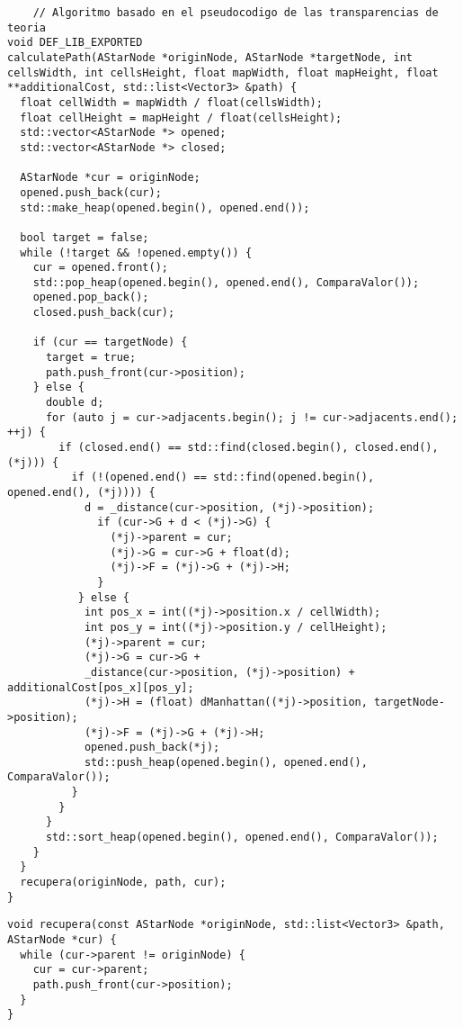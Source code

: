 \begin{lstlisting}
    // Algoritmo basado en el pseudocodigo de las transparencias de teoria
void DEF_LIB_EXPORTED
calculatePath(AStarNode *originNode, AStarNode *targetNode, int cellsWidth, int cellsHeight, float mapWidth, float mapHeight, float **additionalCost, std::list<Vector3> &path) {    
  float cellWidth = mapWidth / float(cellsWidth);
  float cellHeight = mapHeight / float(cellsHeight);
  std::vector<AStarNode *> opened;
  std::vector<AStarNode *> closed;
   
  AStarNode *cur = originNode;
  opened.push_back(cur);
  std::make_heap(opened.begin(), opened.end());
   
  bool target = false;
  while (!target && !opened.empty()) {
    cur = opened.front();
    std::pop_heap(opened.begin(), opened.end(), ComparaValor());
    opened.pop_back();
    closed.push_back(cur);
    
    if (cur == targetNode) {
      target = true;
      path.push_front(cur->position);
    } else {
      double d;
      for (auto j = cur->adjacents.begin(); j != cur->adjacents.end(); ++j) {
        if (closed.end() == std::find(closed.begin(), closed.end(), (*j))) {
          if (!(opened.end() == std::find(opened.begin(), opened.end(), (*j)))) {
            d = _distance(cur->position, (*j)->position);
              if (cur->G + d < (*j)->G) {
                (*j)->parent = cur;
                (*j)->G = cur->G + float(d);
                (*j)->F = (*j)->G + (*j)->H;
              }
           } else {
            int pos_x = int((*j)->position.x / cellWidth);
            int pos_y = int((*j)->position.y / cellHeight);
            (*j)->parent = cur;
            (*j)->G = cur->G +
            _distance(cur->position, (*j)->position) + additionalCost[pos_x][pos_y];
            (*j)->H = (float) dManhattan((*j)->position, targetNode->position);
            (*j)->F = (*j)->G + (*j)->H;
            opened.push_back(*j);
            std::push_heap(opened.begin(), opened.end(), ComparaValor());
          }
        }
      }
      std::sort_heap(opened.begin(), opened.end(), ComparaValor());
    }
  }   
  recupera(originNode, path, cur);
}
\end{lstlisting}

\begin{lstlisting}
void recupera(const AStarNode *originNode, std::list<Vector3> &path, AStarNode *cur) {
  while (cur->parent != originNode) {
    cur = cur->parent;
    path.push_front(cur->position);
  }
}
\end{lstlisting}